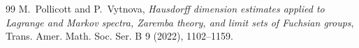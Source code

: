 \documentclass[10pt]{amsart}
\numberwithin{equation}{section}
\theoremstyle{definition}
\begin{document}
\begin{thebibliography}{99}
 M.~Pollicott and P.~Vytnova, \emph{Hausdorff dimension estimates applied to Lagrange and
Markov spectra, Zaremba theory, and limit sets of Fuchsian groups},  Trans. Amer. Math. Soc. Ser. B 9 (2022), 1102–1159. 




    
\end{thebibliography}
\end{document}
